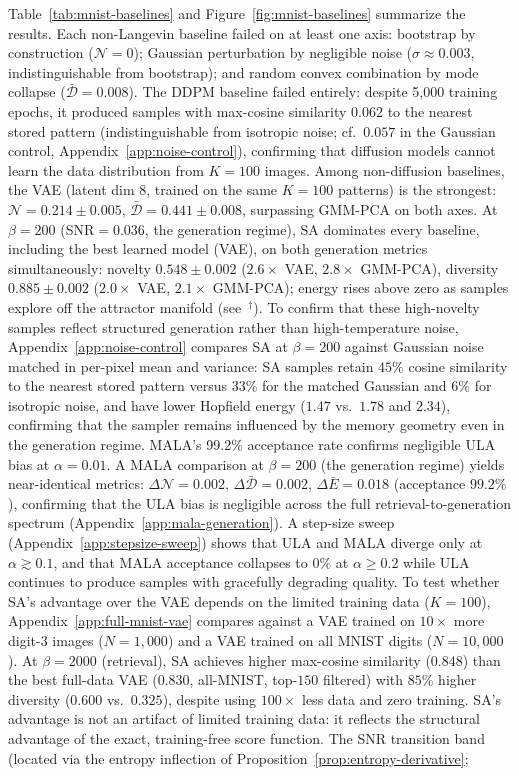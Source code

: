 Table~\ref{tab:mnist-baselines} and Figure~\ref{fig:mnist-baselines} summarize the results. Each non-Langevin baseline failed on at least one axis: bootstrap by construction ($\mathcal{N}{=}0$); Gaussian perturbation by negligible noise ($\sigma{\approx}0.003$, indistinguishable from bootstrap); and random convex combination by mode collapse ($\bar{\mathcal{D}}{=}0.008$). The DDPM baseline failed entirely: despite 5{,}000 training epochs, it produced samples with max-cosine similarity $0.062$ to the nearest stored pattern (indistinguishable from isotropic noise; cf.\ $0.057$ in the Gaussian control, Appendix~\ref{app:noise-control}), confirming that diffusion models cannot learn the data distribution from $K{=}100$ images. Among non-diffusion baselines, the VAE (latent dim 8, trained on the same $K{=}100$ patterns) is the strongest: $\mathcal{N}{=}0.214\pm0.005$, $\bar{\mathcal{D}}{=}0.441\pm0.008$, surpassing GMM-PCA on both axes. At $\beta{=}200$ (SNR$=$0.036, the generation regime), SA dominates every baseline, including the best learned model (VAE), on both generation metrics simultaneously: novelty $0.548\pm0.002$ ($2.6{\times}$ VAE, $2.8{\times}$ GMM-PCA), diversity $0.885\pm0.002$ ($2.0{\times}$ VAE, $2.1{\times}$ GMM-PCA); energy rises above zero as samples explore off the attractor manifold (see~$^\dagger$). To confirm that these high-novelty samples reflect structured generation rather than high-temperature noise, Appendix~\ref{app:noise-control} compares SA at $\beta{=}200$ against Gaussian noise matched in per-pixel mean and variance: SA samples retain $45\%$ cosine similarity to the nearest stored pattern versus $33\%$ for the matched Gaussian and $6\%$ for isotropic noise, and have lower Hopfield energy ($1.47$ vs.\ $1.78$ and $2.34$), confirming that the sampler remains influenced by the memory geometry even in the generation regime. MALA's 99.2\% acceptance rate confirms negligible ULA bias at $\alpha{=}0.01$. A MALA comparison at $\beta{=}200$ (the generation regime) yields near-identical metrics: $\Delta\mathcal{N}{=}0.002$, $\Delta\bar{\mathcal{D}}{=}0.002$, $\Delta\bar{E}{=}0.018$ (acceptance $99.2\%$), confirming that the ULA bias is negligible across the full retrieval-to-generation spectrum (Appendix~\ref{app:mala-generation}). A step-size sweep (Appendix~\ref{app:stepsize-sweep}) shows that ULA and MALA diverge only at $\alpha{\gtrsim}0.1$, and that MALA acceptance collapses to $0\%$ at $\alpha{\geq}0.2$ while ULA continues to produce samples with gracefully degrading quality. To test whether SA's advantage over the VAE depends on the limited training data ($K{=}100$), Appendix~\ref{app:full-mnist-vae} compares against a VAE trained on $10{\times}$ more digit-3 images ($N{=}1{,}000$) and a VAE trained on all MNIST digits ($N{=}10{,}000$). At $\beta{=}2000$ (retrieval), SA achieves higher max-cosine similarity ($0.848$) than the best full-data VAE ($0.830$, all-MNIST, top-$150$ filtered) with $85\%$ higher diversity ($0.600$ vs.\ $0.325$), despite using $100{\times}$ less data and zero training. SA's advantage is not an artifact of limited training data: it reflects the structural advantage of the exact, training-free score function. The SNR transition band (located via the entropy inflection of Proposition~\ref{prop:entropy-derivative}; 